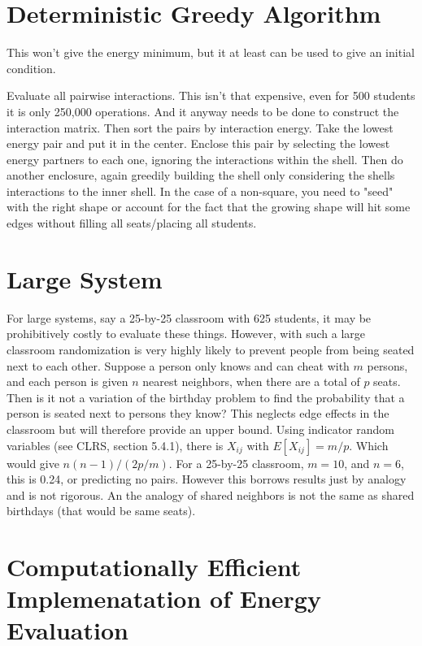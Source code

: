\documentclass{article}
\begin{document}
\section{Deterministic Greedy Algorithm}
This won't give the energy minimum, but it at least can be used to give an initial condition.

Evaluate all pairwise interactions. This isn't that expensive, even for 500 students it is only 250,000 operations. And it anyway needs to be done to construct the interaction matrix. Then sort the pairs by interaction energy. Take the lowest energy pair and put it in the center. Enclose this pair by selecting the lowest energy partners to each one, ignoring the interactions within the shell. Then do another enclosure, again greedily building the shell only considering the shells interactions to the inner shell. In the case of a non-square, you need to "seed" with the right shape or account for the fact that the growing shape will hit some edges without filling all seats/placing all students. 

\section{Large System}

For large systems, say a 25-by-25 classroom with 625 students, it may be prohibitively costly to evaluate these things. However, with such a large classroom randomization is very highly likely to prevent people from being seated next to each other. Suppose a person only knows and can cheat with $m$ persons, and each person is given $n$ nearest neighbors, when there are a total of $p$ seats. Then is it not a variation of the birthday problem to find the probability that a person is seated next to persons they know? This neglects edge effects in the classroom but will therefore provide an upper bound. Using indicator random variables (see CLRS, section 5.4.1), there is $X_{ij}$ with $E[X_{ij}] = m/p$. Which would give $n(n-1)/(2p/m)$. For a 25-by-25 classroom, $m=10$, and $n=6$, this is 0.24, or predicting no pairs. However this borrows results just by analogy and is not rigorous. An the analogy of shared neighbors is not the same as shared birthdays (that would be same seats).

\section{Computationally Efficient Implemenatation of Energy Evaluation}
\end{document}
